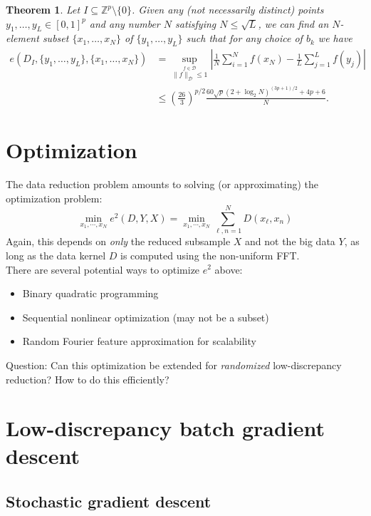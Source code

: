\documentclass[12pt]{article}
\newtheorem{theorem}{Theorem}
\newcommand{\bi}{\begin{itemize}}
\newcommand{\ei}{\end{itemize}}
\newcommand{\satop}[2]{\stackrel{\scriptstyle{#1}}{\scriptstyle{#2}}}
\begin{document}
\begin{theorem}
Let $I \subseteq \mathbb{Z}^p \setminus \{0\}$. Given any (not necessarily distinct) points $y_1, \ldots, y_L \in [0,1]^p$ and any number $N$ satisfying $N \leq \sqrt{L}$, we can find an $N$-element subset $\{x_1, \ldots, x_N\}$ of $\{y_1, \ldots, y_L\}$ such that for any choice of $b_k$ we have
\begin{align*}
e(D_I,\{y_1, \ldots, y_L\}, \{x_1, \ldots, x_N\}) & = \sup_{\satop{f \in \mathcal{D}}{\|f\|_{\mathcal{D}} \le 1}} \left|\frac{1}{N} \sum_{i=1}^N f(x_N) - \frac{1}{L} \sum_{j=1}^L f(y_j) \right| \\ & \le \left( \frac{26}{3} \right)^{p/2} \frac{60 \sqrt{p} (2 + \log_2 N)^{(3p+1)/2} + 4p + 6}{N}.
\label{eq:subset}
\end{align*}
\label{thm:subset}
\end{theorem}

\section{Optimization}

The data reduction problem amounts to solving (or approximating) the optimization problem:
\[ \min_{x_1, \cdots, x_N} e^2(D,Y,X) = \min_{x_1, \cdots, x_N} \sum_{\ell,n =1}^N D(x_\ell, x_n) \]
Again, this depends on \textit{only} the reduced subsample $X$ and not the big data $Y$, as long as the data kernel $D$ is computed using the non-uniform FFT.\\

There are several potential ways to optimize $e^2$ above:
\bi
\item Binary quadratic programming
\item Sequential nonlinear optimization (may not be a subset)
\item Random Fourier feature approximation for scalability \citep{rahimi2008random}
\ei

Question: Can this optimization be extended for \textit{randomized} low-discrepancy reduction? How to do this efficiently?

\section{Low-discrepancy batch gradient descent}

\subsection{Stochastic gradient descent}
\end{document}

